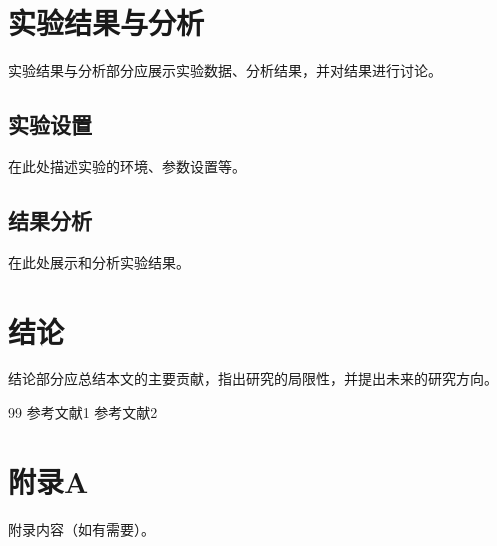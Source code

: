 \documentclass[12pt,a4paper]{article}
\begin{document}
\section{实验结果与分析}
实验结果与分析部分应展示实验数据、分析结果，并对结果进行讨论。

\subsection{实验设置}
在此处描述实验的环境、参数设置等。

\subsection{结果分析}
在此处展示和分析实验结果。

\section{结论}
结论部分应总结本文的主要贡献，指出研究的局限性，并提出未来的研究方向。

\begin{thebibliography}{99}
 参考文献1
 参考文献2
\end{thebibliography}

\appendix
\section{附录A}
附录内容（如有需要）。
\end{document}
